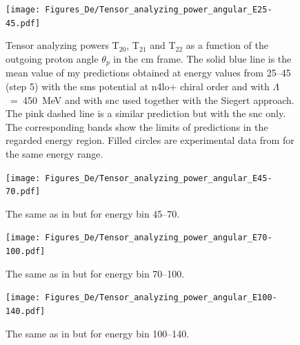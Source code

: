     \begin{figure}[h]
        \begin{center}
        \texttt{[image: Figures\_De/Tensor\_analyzing\_power\_angular\_E25-45.pdf]}
        \end{center}
        \caption{Tensor analyzing powers T$_{20}$, T$_{21}$ and T$_{22}$ as a function of the
        outgoing proton angle $\theta_p$ in the \gls{cm} frame.
        The solid blue line is the mean value of my predictions obtained 
        at energy values from \SIrange[range-phrase=\text{ to }]{25}{45}{\mev} (step \SI{5}{\mev}) with the
        \gls{sms} potential at \gls{n4lo+} chiral order and with $\Lambda$~=~450~MeV
         and with \gls{snc} used together with the Siegert approach. 
        The pink dashed line is a similar prediction but with the \gls{snc} only. 
        The corresponding bands show the limits of predictions in the regarded
        energy region.
        Filled circles are experimental data
        from \cite{rachek2007} for the same energy range.}
        \label{tensor_angular_25-45}
    \end{figure}

    \begin{figure}[h]
        \begin{center}
        \texttt{[image: Figures\_De/Tensor\_analyzing\_power\_angular\_E45-70.pdf]}
        \end{center}
        \caption{The same as in  but for energy bin \SIrange{45}{70}{\mev}.}
        \label{tensor_angular_45-70}
    \end{figure}

    \begin{figure}[h]
        \begin{center}
        \texttt{[image: Figures\_De/Tensor\_analyzing\_power\_angular\_E70-100.pdf]}
        \end{center}
        \caption{The same as in  but for energy bin \SIrange{70}{100}{\mev}.}
        \label{tensor_angular_70-100}
    \end{figure}        

    \begin{figure}[h]
        \begin{center}
        \texttt{[image: Figures\_De/Tensor\_analyzing\_power\_angular\_E100-140.pdf]}
        \end{center}
        \caption{The same as in  but for energy bin \SIrange{100}{140}{\mev}.}
        \label{tensor_angular_100-140}
    \end{figure}
        
